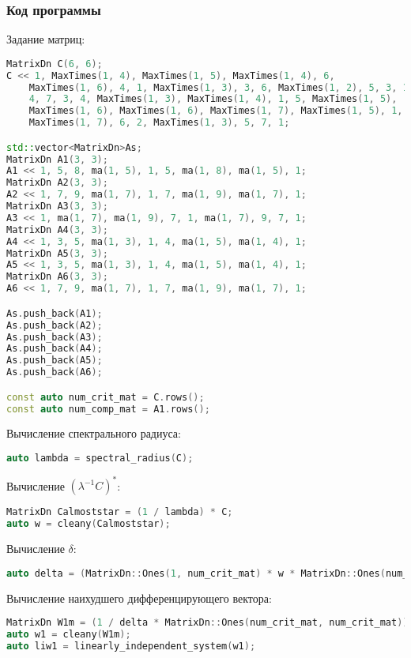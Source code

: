\documentclass[specialist,
	substylefile = spbu_report.rtx,
	subf,href,colorlinks=true, 12pt]{disser}
\begin{document}
\subsubsection{Код программы}

Задание матриц:
\begin{lstlisting}[language=c++,basicstyle=\small\ttfamily,keywordstyle=\color{red}]
MatrixDn C(6, 6);
C << 1, MaxTimes(1, 4), MaxTimes(1, 5), MaxTimes(1, 4), 6,
    MaxTimes(1, 6), 4, 1, MaxTimes(1, 3), 3, 6, MaxTimes(1, 2), 5, 3, 1,
    4, 7, 3, 4, MaxTimes(1, 3), MaxTimes(1, 4), 1, 5, MaxTimes(1, 5),
    MaxTimes(1, 6), MaxTimes(1, 6), MaxTimes(1, 7), MaxTimes(1, 5), 1,
    MaxTimes(1, 7), 6, 2, MaxTimes(1, 3), 5, 7, 1;

std::vector<MatrixDn>As;
MatrixDn A1(3, 3);
A1 << 1, 5, 8, ma(1, 5), 1, 5, ma(1, 8), ma(1, 5), 1;
MatrixDn A2(3, 3);
A2 << 1, 7, 9, ma(1, 7), 1, 7, ma(1, 9), ma(1, 7), 1;
MatrixDn A3(3, 3);
A3 << 1, ma(1, 7), ma(1, 9), 7, 1, ma(1, 7), 9, 7, 1;
MatrixDn A4(3, 3);
A4 << 1, 3, 5, ma(1, 3), 1, 4, ma(1, 5), ma(1, 4), 1;
MatrixDn A5(3, 3);
A5 << 1, 3, 5, ma(1, 3), 1, 4, ma(1, 5), ma(1, 4), 1;
MatrixDn A6(3, 3);
A6 << 1, 7, 9, ma(1, 7), 1, 7, ma(1, 9), ma(1, 7), 1;

As.push_back(A1);
As.push_back(A2);
As.push_back(A3);
As.push_back(A4);
As.push_back(A5);
As.push_back(A6);

const auto num_crit_mat = C.rows();
const auto num_comp_mat = A1.rows();
\end{lstlisting}

Вычисление спектрального радиуса:
\begin{lstlisting}[language=c++,basicstyle=\footnotesize\ttfamily]
auto lambda = spectral_radius(C);
\end{lstlisting}

Вычисление $(\lambda^{-1}C)^*$:
\begin{lstlisting}[language=c++,basicstyle=\footnotesize\ttfamily]
MatrixDn Calmoststar = (1 / lambda) * C;
auto w = cleany(Calmoststar);
\end{lstlisting}


Вычисление $\delta$:
\begin{lstlisting}[language=c++,basicstyle=\footnotesize\ttfamily]
auto delta = (MatrixDn::Ones(1, num_crit_mat) * w * MatrixDn::Ones(num_crit_mat, 1)).value();
\end{lstlisting}

Вычисление наихудшего дифференцирующего вектора:
\begin{lstlisting}[language=c++,basicstyle=\footnotesize\ttfamily]
MatrixDn W1m = (1 / delta * MatrixDn::Ones(num_crit_mat, num_crit_mat)) + Calmoststar;
auto w1 = cleany(W1m);
auto liw1 = linearly_independent_system(w1);
\end{lstlisting}
\end{document}
